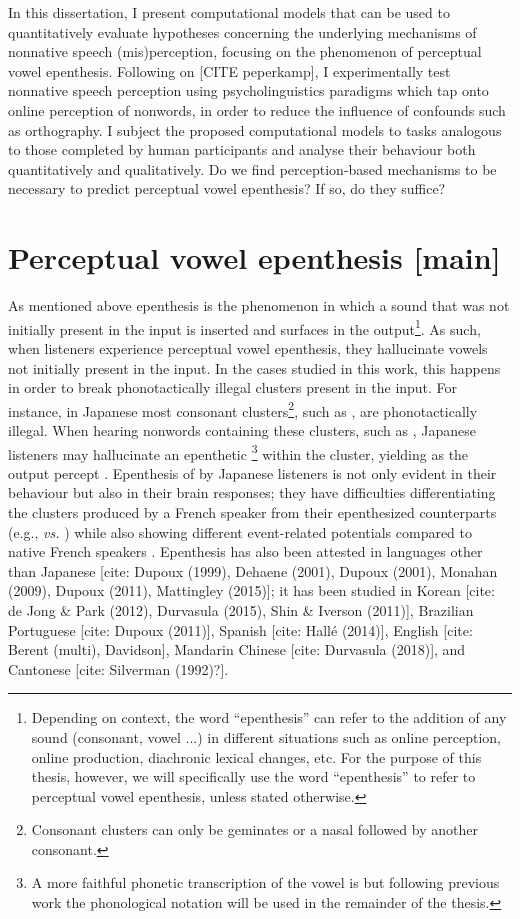 In this dissertation, I present computational models that can be used to quantitatively evaluate hypotheses concerning the underlying mechanisms of nonnative speech (mis)perception, focusing on the phenomenon of perceptual vowel epenthesis. Following on [CITE peperkamp], I experimentally test nonnative speech perception using psycholinguistics paradigms which tap onto online perception of nonwords, in order to reduce the influence of confounds such as orthography. I subject the proposed computational models to tasks analogous to those completed by human participants and analyse their behaviour both quantitatively and qualitatively. Do we find perception-based mechanisms to be necessary to predict perceptual vowel epenthesis? If so, do they suffice? 


\section{Perceptual vowel epenthesis [main]}

As mentioned above epenthesis is the phenomenon in which a sound that was not initially present in the input is inserted and surfaces in the output\footnote{Depending on context, the word ``epenthesis'' can refer to the addition of any sound (consonant, vowel ...) in different situations such as online perception, online production, diachronic lexical changes, etc. For the purpose of this thesis, however, we will specifically use the word ``epenthesis'' to refer to perceptual vowel epenthesis, unless stated otherwise.}. As such, when listeners experience perceptual vowel epenthesis, they hallucinate vowels not initially present in the input. In the cases studied in this work, this happens in order to break phonotactically illegal clusters present in the input. For instance, in Japanese most consonant clusters\footnote{Consonant clusters can only be geminates or a nasal followed by another consonant.}, such as , are phonotactically illegal. When hearing nonwords containing these clusters, such as , Japanese listeners may hallucinate an epenthetic \footnote{A more faithful phonetic transcription of the vowel is \textipa{[W]} but following previous work the phonological notation  will be used in the remainder of the thesis.} within the cluster, yielding  as the output percept \cite{dupoux1999}. Epenthesis of  by Japanese listeners is not only evident in their behaviour but also in their brain responses; they have difficulties differentiating the clusters produced by a French speaker from their epenthesized counterparts (e.g.,  \textit{vs.} ) while also showing different event-related potentials compared to native French speakers \cite{dehaene2000}.
Epenthesis has also been attested in languages other than Japanese [cite: Dupoux (1999), Dehaene (2001), Dupoux (2001), Monahan (2009), Dupoux (2011), Mattingley (2015)]; it has been studied in Korean [cite: de Jong \& Park (2012), Durvasula (2015), Shin \& Iverson (2011)], Brazilian Portuguese [cite: Dupoux (2011)], Spanish [cite: Hallé (2014)], English [cite: Berent (multi), Davidson], Mandarin Chinese [cite: Durvasula (2018)], and Cantonese [cite: Silverman (1992)?]. 


